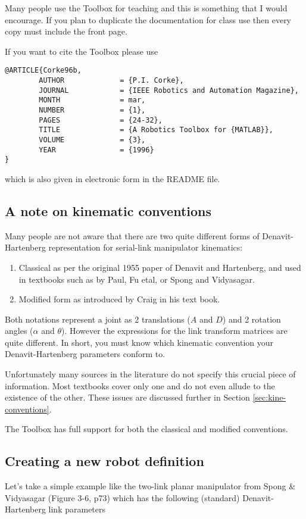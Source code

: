 \documentclass{article}
\begin{document}
Many people use the Toolbox for teaching and this is something that
I would encourage.  If you plan to duplicate the documentation for class
use then every copy must include the front page.

If you want to cite the Toolbox please use
\begin{verbatim}
@ARTICLE{Corke96b,
        AUTHOR             = {P.I. Corke},
        JOURNAL            = {IEEE Robotics and Automation Magazine},
        MONTH              = mar,
        NUMBER             = {1},
        PAGES              = {24-32},
        TITLE              = {A Robotics Toolbox for {MATLAB}},
        VOLUME             = {3},
        YEAR               = {1996}
}
\end{verbatim}
which is also given in electronic form in the README file.

\subsection{A note on kinematic conventions}
Many people are not aware that there are two quite different forms of 
Denavit-Hartenberg representation for serial-link manipulator kinematics:
\begin{enumerate}
\item Classical as per the original 1955 paper of Denavit and Hartenberg,
and used in textbooks such as by Paul\cite{Paul81a}, Fu etal\cite{Fu87}, or 
Spong and Vidyasagar\cite{Spong89}.
\item Modified form as introduced by Craig\cite{Craig86} in his text book.
\end{enumerate}
Both notations represent a joint as 2 translations ($A$ and $D$) and 2
rotation angles 
($\alpha$ and $\theta$).  However the expressions for the link transform
matrices are quite different.  In short, you must know which kinematic
convention your Denavit-Hartenberg parameters conform to.

Unfortunately many sources in the literature do not specify this crucial
piece of information.
Most textbooks cover only one and do not even allude to the existence of the
other.
These issues are discussed further in Section \ref{sec:kine-conventions}.

The Toolbox has full support for both the classical and
modified conventions.

\subsection{Creating a new robot definition}
Let's take a simple example like the two-link planar manipulator from
Spong \& Vidyasagar\cite{Spong89} (Figure 3-6, p73) which has the following
(standard) Denavit-Hartenberg link parameters 
\end{document}
